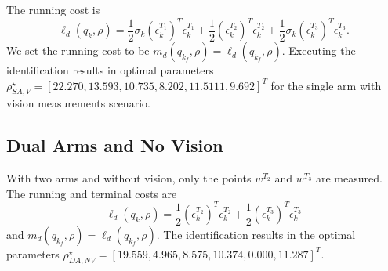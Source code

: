 \documentclass[runningheads,a4paper]{llncs}
\begin{document}

The running cost is 
\[
\ell_d(q_k,\rho) = \frac{1}{2}\sigma_k (\epsilon^{T_1}_k)^T\epsilon^{T_1}_k + \frac{1}{2} (\epsilon^{T_2}_k)^T\epsilon^{T_2}_k +\frac{1}{2}\sigma_k (\epsilon^{T_3}_k)^T\epsilon^{T_3}_k.
\]
We set the running cost to be $m_d(q_{k_f},\rho) = \ell_d(q_{k_f},\rho)$. Executing the identification results in optimal parameters $\rho^\star_{SA,V} = [22.270 , 13.593 , 10.735 ,  8.202  ,11.5111,   9.692]^T$ for the single arm with vision measurements scenario.

\subsection{Dual Arms and No Vision \label{sec-2_no_vis}}
With two arms and without vision, only the points $w^{T_2}$ and $w^{T_3}$ are measured. The running and terminal costs are 
\[
\ell_d(q_k,\rho) = \frac{1}{2}(\epsilon^{T_2}_k)^T\epsilon^{T_2}_k +\frac{1}{2}(\epsilon^{T_3}_k)^T\epsilon^{T_3}_k 
\]
and $m_d(q_{k_f},\rho) = \ell_d(q_{k_f},\rho)$. The identification results in the optimal parameters $\rho^\star_{DA,NV} = [19.559, 4.965, 8.575, 10.374, 0.000, 11.287]^T$.
\end{document}
